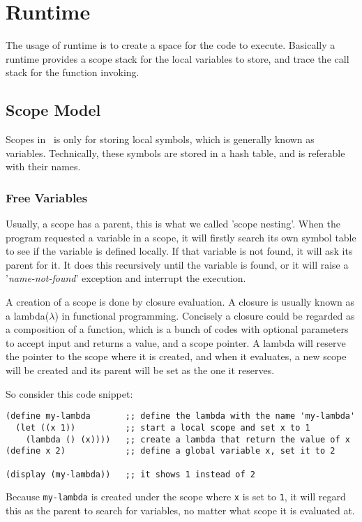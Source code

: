 \section{Runtime}
The usage of runtime is to create a space for the code to
execute. Basically a runtime provides a scope stack for the local
variables to store, and trace the call stack for the function
invoking.

\subsection{Scope Model}
Scopes in \revo\ is only for storing local symbols, which is generally
known as variables. Technically, these symbols are stored in a hash
table, and is referable with their names.

\subsubsection{Free Variables}
Usually, a scope has a parent, this is what we called 'scope nesting'.
When the program requested a variable in a scope, it will firstly
search its own symbol table to see if the variable is defined
locally. If that variable is not found, it will ask its parent for
it. It does this recursively until the variable is found, or it will
raise a '\emph{name-not-found}' exception and interrupt the execution.

A creation of a scope is done by closure evaluation. A closure is
usually known as a lambda($\lambda$) in functional
programming. Concisely a closure could be regarded as a composition of
a function, which is a bunch of codes with optional parameters to accept input and
returns a value, and a scope pointer. A lambda will reserve the
pointer to the scope where it is created, and when it evaluates, a new
scope will be created and its parent will be set as the one it
reserves.

So consider this code snippet:
\begin{verbatim}
(define my-lambda       ;; define the lambda with the name 'my-lambda'
  (let ((x 1))          ;; start a local scope and set x to 1
    (lambda () (x))))   ;; create a lambda that return the value of x
(define x 2)            ;; define a global variable x, set it to 2

(display (my-lambda))   ;; it shows 1 instead of 2
\end{verbatim}

Because \verb+my-lambda+ is created under the scope where \verb+x+ is
set to \verb+1+, it will regard this as the parent to search for
variables, no matter what scope it is evaluated at.

